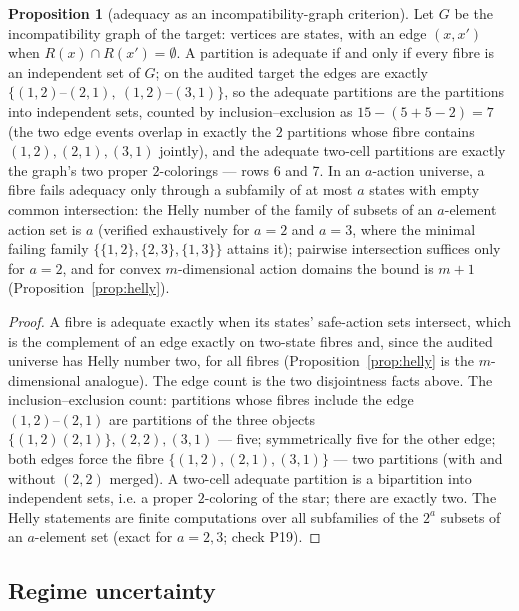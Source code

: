 \documentclass[10pt,twocolumn]{article}
\theoremstyle{definition}
\newtheorem{proposition}{Proposition}
\begin{document}
\begin{proposition}[adequacy as an incompatibility-graph criterion]
\label{prop:adequacy}
Let \(G\) be the incompatibility graph of the target: vertices are
states, with an edge \((x, x')\) when \(R(x) \cap R(x') =
\emptyset\). A partition is adequate if and only if every fibre is an
independent set of \(G\); on the audited target the edges are exactly
\(\{(1,2)\text{--}(2,1),\ (1,2)\text{--}(3,1)\}\), so the adequate
partitions are the partitions into independent sets, counted by
inclusion--exclusion as \(15 - (5 + 5 - 2) = 7\) (the two edge events
overlap in exactly the \(2\) partitions whose fibre contains
\((1,2), (2,1), (3,1)\) jointly), and the adequate two-cell partitions
are exactly the graph's two proper \(2\)-colorings --- rows 6 and 7.
In an \(a\)-action universe, a fibre fails adequacy only through a
subfamily of at most \(a\) states with empty common intersection: the
Helly number of the family of subsets of an \(a\)-element action set
is \(a\) (verified exhaustively for \(a = 2\) and \(a = 3\), where the
minimal failing family \(\{\{1,2\}, \{2,3\}, \{1,3\}\}\) attains it);
pairwise intersection suffices only for \(a = 2\), and for convex
\(m\)-dimensional action domains the bound is \(m + 1\)
(Proposition~\ref{prop:helly}).
\end{proposition}

\begin{proof}
A fibre is adequate exactly when its states' safe-action sets intersect,
which is the complement of an edge exactly on two-state fibres and,
since the audited universe has Helly number two, for all fibres
(Proposition~\ref{prop:helly} is the \(m\)-dimensional analogue). The
edge count is the two disjointness facts above. The inclusion--exclusion
count: partitions whose fibres include the edge \((1,2)\text{--}(2,1)\)
are partitions of the three objects \(\{(1,2)(2,1)\}, (2,2), (3,1)\) ---
five; symmetrically five for the other edge; both edges force the
fibre \(\{(1,2), (2,1), (3,1)\}\) --- two partitions (with and without
\((2,2)\) merged). A two-cell adequate partition is a bipartition into
independent sets, i.e. a proper \(2\)-coloring of the star; there are
exactly two. The Helly statements are finite computations over all
subfamilies of the \(2^{a}\) subsets of an \(a\)-element set (exact for
\(a = 2, 3\); check P19).
\end{proof}

\subsection{Regime uncertainty}\label{regimes}
\end{document}
